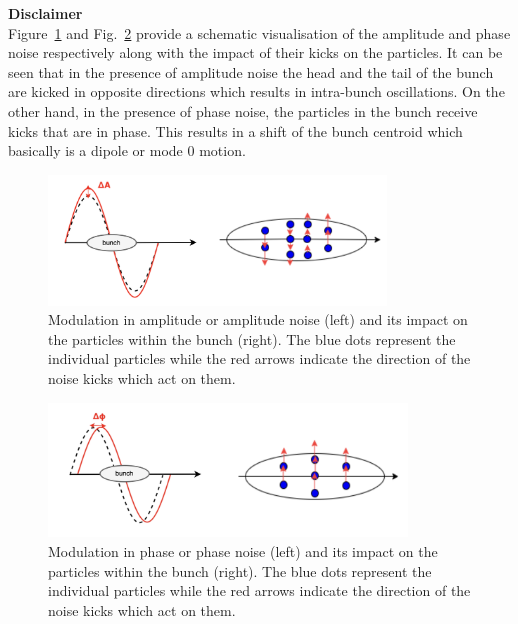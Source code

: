 \textbf{Disclaimer}\\


Figure~\ref{fig:amplitude_noise} and Fig.~\ref{fig:phase_noise} provide a schematic visualisation of the amplitude and phase noise respectively along with the impact of their kicks on the particles. It can be seen that in the presence of amplitude noise the head and the tail of the bunch are kicked in opposite directions which results in intra-bunch oscillations. On the other hand, in the presence of phase noise, the particles in the bunch receive kicks that are in phase. This results in a shift of the bunch centroid which basically is a dipole or mode 0 motion.

\begin{figure}[!h] %
    \centering         
    \includegraphics[width=0.8\textwidth]{images/Ch3/amplitude_noise.png}
        \caption{Modulation in amplitude or amplitude noise (left) and its impact on the particles within the bunch (right). The blue dots represent the individual particles while the red arrows indicate the direction of the noise kicks which act on them.}
        \label{fig:amplitude_noise}
 \end{figure}

 \begin{figure}[!h] %
    \centering         
    \includegraphics[width=0.85\textwidth]{images/Ch3/phase_noise.png}
        \caption{Modulation in phase or phase noise (left) and its impact on the particles within the bunch (right). The blue dots represent the individual particles while the red arrows indicate the direction of the noise kicks which act on them.}
        \label{fig:phase_noise}
 \end{figure}

